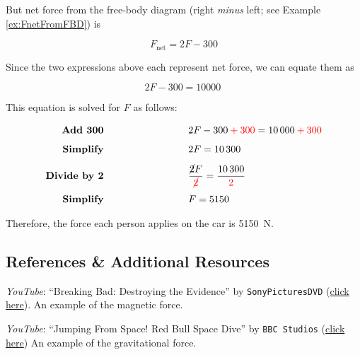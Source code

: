 \documentclass[main.tex]{subfiles}
\begin{document}
But net force from the free-body diagram (right \textit{minus} left; see Example \ref{ex:FnetFromFBD}) is

\begin{equation*}
    F_{\text{net}} = 2F - 300
\end{equation*}

Since the two expressions above each represent net force, we can equate them as

\begin{equation*}
    2F - 300 = \SI{10000}{}
\end{equation*}

This equation is solved for $F$ as follows:

\begin{align*}
    \textbf{Add 300} \hspace{9cm} 
    & \hspace{-6cm} 2F - 300 \mathbin{\textcolor{red}{+}} \textcolor{red}{300} = \SI{10000}{} \mathbin{\textcolor{red}{+}} \textcolor{red}{300}\\[1ex]
    \textbf{Simplify} \hspace{9cm}
    & \hspace{-6cm} 2F = \SI{10300}{}\\[1ex]
    \textbf{Divide by 2} \hspace{9cm}
    & \hspace{-6cm} \frac{\cancel{2}F}{\textcolor{red}{\cancel{2}}} = \frac{\SI{10300}{}}{\textcolor{red}{2}}\\[1ex]
    \textbf{Simplify} \hspace{9cm} 
    & \hspace{-6cm} F = 5150
\end{align*}

Therefore, the force each person applies on the car is \SI{5150}{N}.

\solutionEnd

\vspace{1em}

\cyanhrule


\subsection{References \& Additional Resources}

\textit{YouTube}: ``Breaking Bad: Destroying the Evidence'' by \texttt{SonyPicturesDVD} (\href{https://youtu.be/gzCXowhks80?t=3}{click here}). An example of the magnetic force.

\textit{YouTube}: ``Jumping From Space! Red Bull Space Dive'' by \texttt{BBC Studios} (\href{https://youtu.be/E9oKEJ1pXPw}{click here}) An example of the gravitational force.
\end{document}
